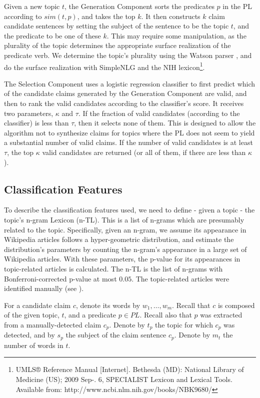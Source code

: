 \documentclass[11pt]{article}
\begin{document}
Given a new topic %
$t$, the Generation Component sorts the predicates $p$ in the PL according to $sim(t,p)$, and takes the top $k$. It
then constructs $k$ claim candidate sentences by setting the subject of the sentence to be the topic $t$, and the predicate to be one of these $k$. This may require some manipulation, as the plurality of the topic determines the appropriate surface realization of the predicate verb. We determine the topic's plurality using the Watson parser \cite{watson}, and do the surface realization with SimpleNLG \cite{simpleNLG} and the NIH lexicon\footnote{UMLS® Reference Manual [Internet]. Bethesda (MD): National Library of Medicine (US); 2009 Sep-. 6, SPECIALIST Lexicon and Lexical Tools. Available from: http://www.ncbi.nlm.nih.gov/books/NBK9680/}. 

The Selection Component uses a logistic regression classifier to first predict which of the candidate claims generated by the Generation Component are valid, and then to rank the valid candidates according to the classifier's score. It receives two parameters, $\kappa$ and $\tau$. If the fraction of valid candidates (according to the classifier) is less than $\tau$, then it selects none of them. This is designed to allow the algorithm not to synthesize claims for topics where the PL does not seem to yield a substantial number of valid claims. If the number of valid candidates is at least $\tau$, the top $\kappa$ valid candidates are returned (or all of them, if there are less than $\kappa$).

\subsection{Classification Features}\label{sec:features}
To describe the classification features used, we need to define - given a topic - the topic's n-gram Lexicon (n-TL). This is a list of n-grams which are presumably related to the topic. Specifically, given an n-gram, we assume its appearance in Wikipedia articles follows a hyper-geometric distribution, and estimate the distribution's parameters by counting the n-gram's appearance in a large set of Wikipedia articles. With these parameters, the p-value for its appearances in topic-related articles is calculated. The n-TL is the list of n-grams with Bonferroni-corrected p-value at most $0.05$. The topic-related articles were identified manually (see \cite{debater}).

For a candidate claim $c$, denote its words by $w_1, \ldots, w_m$. Recall that $c$ is composed of the given topic, $t$, and a predicate $p \in PL$. Recall also that $p$ was extracted from a manually-detected claim $c_p$. Denote by $t_p$ the topic for which $c_p$ was detected, and by $s_p$ the subject of the claim sentence 
$c_p$. Denote by $m_t$ the number of words in $t$. 
\end{document}
